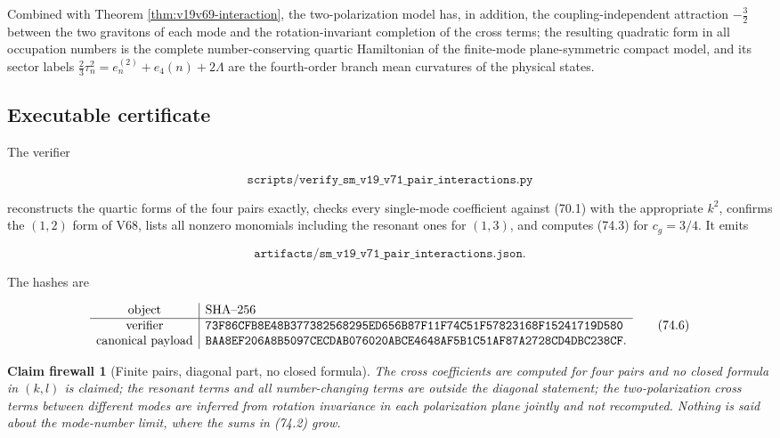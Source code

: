 \documentclass[11pt]{article}
\newtheorem{firewall}[theorem]{Claim firewall}
\theoremstyle{remark}
\begin{document}
Combined with Theorem \ref{thm:v19v69-interaction}, the two-polarization
model has, in addition, the coupling-independent attraction \(-\tfrac32\)
between the two gravitons of each mode and the rotation-invariant
completion of the cross terms; the resulting quadratic form in all
occupation numbers is the complete number-conserving quartic
Hamiltonian of the finite-mode plane-symmetric compact model, and its
sector labels \(\tfrac23\tau_n^2=e^{(2)}_n+e_4(n)+2\Lambda\) are the
fourth-order branch mean curvatures of the physical states.

\subsection{Executable certificate}

The verifier

\[
 \texttt{scripts/verify\_sm\_v19\_v71\_pair\_interactions.py}        \tag{74.4}
\]

reconstructs the quartic forms of the four pairs exactly, checks every
single-mode coefficient against (70.1) with the appropriate \(k^2\),
confirms the \((1,2)\) form of V68, lists all nonzero monomials
including the resonant ones for \((1,3)\), and computes (74.3) for
\(c_g=3/4\).  It emits

\[
 \texttt{artifacts/sm\_v19\_v71\_pair\_interactions.json}.           \tag{74.5}
\]

The hashes are

\[
\begin{array}{c|l}
\hbox{object}&\hbox{SHA--256}\\ \hline
\hbox{verifier}&
\texttt{73F86CFB8E48B377382568295ED656B87F11F74C51F57823168F15241719D580}\\
\hbox{canonical payload}&
\texttt{BAA8EF206A8B5097CECDAB076020ABCE4648AF5B1C51AF87A2728CD4DBC238CF}.
\end{array}                                                     \tag{74.6}
\]

\begin{firewall}[Finite pairs, diagonal part, no closed formula]
\label{fire:v19v71}
The cross coefficients are computed for four pairs and no closed
formula in \((k,l)\) is claimed; the resonant terms and all
number-changing terms are outside the diagonal statement; the
two-polarization cross terms between different modes are inferred from
rotation invariance in each polarization plane jointly and not
recomputed.  Nothing is said about the mode-number limit, where the
sums in (74.2) grow.
\end{firewall}
\end{document}
